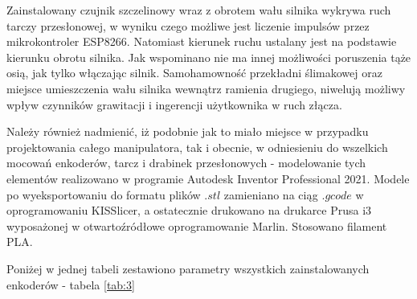 Zainstalowany czujnik szczelinowy wraz z obrotem wału silnika wykrywa ruch tarczy przesłonowej, w wyniku czego możliwe jest liczenie impulsów przez mikrokontroler ESP8266. Natomiast kierunek ruchu ustalany jest na podstawie kierunku obrotu silnika. Jak wspominano nie ma innej możliwości poruszenia tąże osią, jak tylko włączając silnik. Samohamowność przekładni ślimakowej oraz miejsce umieszczenia wału silnika wewnątrz ramienia drugiego, niwelują możliwy wpływ czynników grawitacji i ingerencji użytkownika w ruch złącza.

Należy również nadmienić, iż podobnie jak to miało miejsce w przypadku projektowania całego manipulatora, tak i obecnie, w odniesieniu do wszelkich mocowań enkoderów, tarcz i drabinek przesłonowych - modelowanie tych elementów realizowano w programie Autodesk Inventor Professional 2021. Modele po wyeksportowaniu do formatu plików $.stl$ zamieniano na ciąg $.gcode$ w oprogramowaniu KISSlicer, a ostatecznie drukowano na drukarce Prusa i3 wyposażonej w otwartoźródłowe oprogramowanie Marlin. Stosowano filament PLA.

Poniżej w jednej tabeli zestawiono parametry wszystkich zainstalowanych enkoderów - tabela \ref{tab:3}

